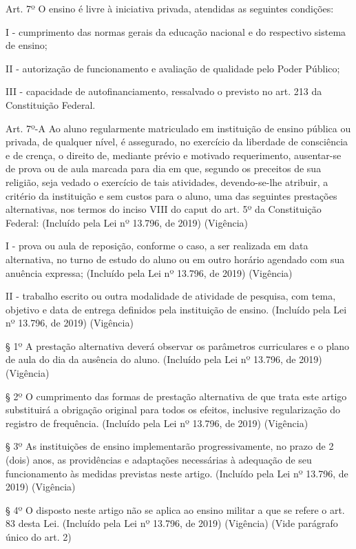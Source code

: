 \documentclass[
]{book}
\begin{document}
Art. 7º O ensino é livre à iniciativa privada, atendidas as seguintes condições:

I - cumprimento das normas gerais da educação nacional e do respectivo sistema de ensino;

II - autorização de funcionamento e avaliação de qualidade pelo Poder Público;

III - capacidade de autofinanciamento, ressalvado o previsto no art. 213 da Constituição Federal.

Art. 7º-A Ao aluno regularmente matriculado em instituição de ensino pública ou privada, de qualquer nível, é assegurado, no exercício da liberdade de consciência e de crença, o direito de, mediante prévio e motivado requerimento, ausentar-se de prova ou de aula marcada para dia em que, segundo os preceitos de sua religião, seja vedado o exercício de tais atividades, devendo-se-lhe atribuir, a critério da instituição e sem custos para o aluno, uma das seguintes prestações alternativas, nos termos do inciso VIII do caput do art. 5º da Constituição Federal: (Incluído pela Lei nº 13.796, de 2019) (Vigência)

I - prova ou aula de reposição, conforme o caso, a ser realizada em data alternativa, no turno de estudo do aluno ou em outro horário agendado com sua anuência expressa; (Incluído pela Lei nº 13.796, de 2019) (Vigência)

II - trabalho escrito ou outra modalidade de atividade de pesquisa, com tema, objetivo e data de entrega definidos pela instituição de ensino. (Incluído pela Lei nº 13.796, de 2019) (Vigência)

§ 1º A prestação alternativa deverá observar os parâmetros curriculares e o plano de aula do dia da ausência do aluno. (Incluído pela Lei nº 13.796, de 2019) (Vigência)

§ 2º O cumprimento das formas de prestação alternativa de que trata este artigo substituirá a obrigação original para todos os efeitos, inclusive regularização do registro de frequência. (Incluído pela Lei nº 13.796, de 2019) (Vigência)

§ 3º As instituições de ensino implementarão progressivamente, no prazo de 2 (dois) anos, as providências e adaptações necessárias à adequação de seu funcionamento às medidas previstas neste artigo. (Incluído pela Lei nº 13.796, de 2019) (Vigência)

§ 4º O disposto neste artigo não se aplica ao ensino militar a que se refere o art. 83 desta Lei. (Incluído pela Lei nº 13.796, de 2019) (Vigência) (Vide parágrafo único do art. 2)
\end{document}
